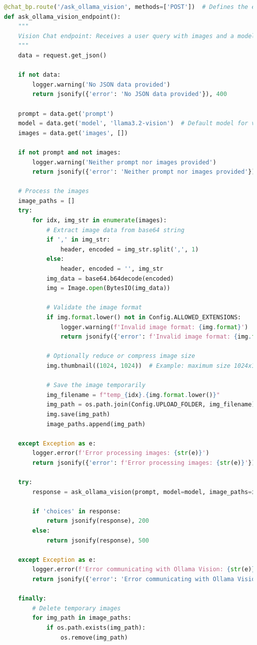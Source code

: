 \begin{lstlisting}[language=Python]
@chat_bp.route('/ask_ollama_vision', methods=['POST'])  # Defines the endpoint using POST method
def ask_ollama_vision_endpoint():
    """
    Vision Chat endpoint: Receives a user query with images and a model, communicates with Ollama Vision, and returns the response.
    """
    data = request.get_json()

    if not data:
        logger.warning('No JSON data provided')
        return jsonify({'error': 'No JSON data provided'}), 400

    prompt = data.get('prompt')
    model = data.get('model', 'llama3.2-vision')  # Default model for vision tasks
    images = data.get('images', [])

    if not prompt and not images:
        logger.warning('Neither prompt nor images provided')
        return jsonify({'error': 'Neither prompt nor images provided'}), 400

    # Process the images
    image_paths = []
    try:
        for idx, img_str in enumerate(images):
            # Extract image data from base64 string
            if ',' in img_str:
                header, encoded = img_str.split(',', 1)
            else:
                header, encoded = '', img_str
            img_data = base64.b64decode(encoded)
            img = Image.open(BytesIO(img_data))

            # Validate the image format
            if img.format.lower() not in Config.ALLOWED_EXTENSIONS:
                logger.warning(f'Invalid image format: {img.format}')
                return jsonify({'error': f'Invalid image format: {img.format}'}), 400

            # Optionally reduce or compress image size
            img.thumbnail((1024, 1024))  # Example: maximum size 1024x1024

            # Save the image temporarily
            img_filename = f"temp_{idx}.{img.format.lower()}"
            img_path = os.path.join(Config.UPLOAD_FOLDER, img_filename)
            img.save(img_path)
            image_paths.append(img_path)

    except Exception as e:
        logger.error(f'Error processing images: {str(e)}')
        return jsonify({'error': f'Error processing images: {str(e)}'}), 400

    try:
        response = ask_ollama_vision(prompt, model=model, image_paths=image_paths)

        if 'choices' in response:
            return jsonify(response), 200
        else:
            return jsonify(response), 500

    except Exception as e:
        logger.error(f'Error communicating with Ollama Vision: {str(e)}')
        return jsonify({'error': 'Error communicating with Ollama Vision'}), 500

    finally:
        # Delete temporary images
        for img_path in image_paths:
            if os.path.exists(img_path):
                os.remove(img_path)
\end{lstlisting}

